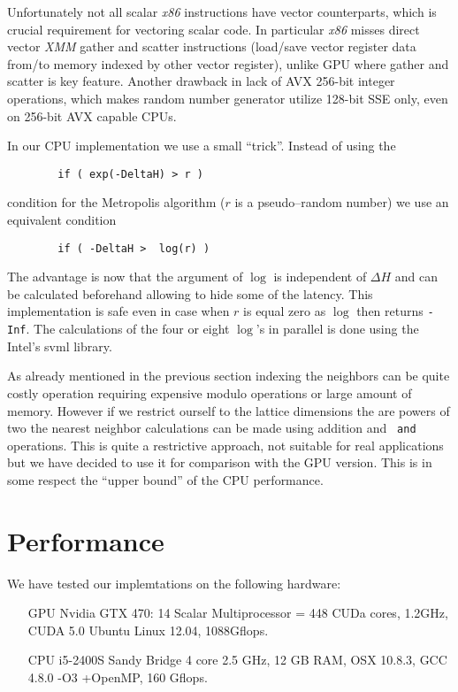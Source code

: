 \documentclass[a4paper]{llncs}
\begin{document}
Unfortunately not all scalar \emph{x86} instructions have vector counterparts,
which is crucial requirement for vectoring scalar code. In particular
\emph{x86} misses direct vector \emph{XMM} gather and scatter instructions
(load/save vector register data from/to memory indexed by other vector
register), unlike GPU where gather and scatter is key feature. Another drawback
in lack of AVX 256-bit integer operations, which makes random number generator
utilize 128-bit SSE only, even on 256-bit AVX capable CPUs.

In our CPU implementation we use a small ``trick''. Instead of using the
\begin{lstlisting}
        if ( exp(-DeltaH) > r )
\end{lstlisting}
condition for the Metropolis algorithm ($r$ is a pseudo--random number) we use
an equivalent condition
\begin{lstlisting}
        if ( -DeltaH >  log(r) )
\end{lstlisting}

The advantage is now that the argument of $\log$ is independent of
$\Delta H$ and can be calculated beforehand allowing to hide some of
the latency. This implementation is safe even in case when $r$ is
equal zero as $\log$ then returns {\tt -Inf}.  The calculations of the
four or eight $\log$'s in parallel is done using the Intel's svml
library.

As already mentioned in the previous section indexing the neighbors
can be quite costly operation requiring expensive modulo
operations or large amount of memory. However if
we restrict ourself to the lattice dimensions the are powers of two
the nearest neighbor calculations can be made using addition and {\tt
  and} operations. This is quite a restrictive approach, not suitable
for real applications but we have decided to use it for comparison
with the GPU version. This is in some respect the ``upper bound'' of
the CPU performance.


\section{Performance}
\label{sec:performance}

We have tested our implemtations on  the following hardware:
\begin{itemize}
\item[GPU]  Nvidia GTX 470: 14 Scalar Multiprocessor = 448 CUDa cores, 1.2GHz, CUDA 5.0 Ubuntu Linux 12.04, 1088Gflops.
\item[CPU]  i5-2400S Sandy Bridge 4 core 2.5 GHz, 12 GB RAM, OSX 10.8.3, GCC 4.8.0 -O3 +OpenMP, 160 Gflops. 
\end{itemize}
\end{document}
